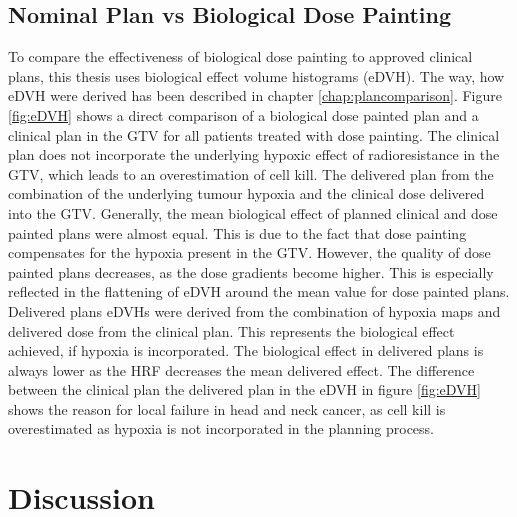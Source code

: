 \subsection{Nominal Plan vs Biological Dose Painting}
To compare the effectiveness of biological dose painting to approved clinical plans, this thesis uses biological effect volume histograms (eDVH). The way, how eDVH were derived has been described in chapter \ref{chap:plancomparison}. Figure \ref{fig:eDVH} shows a direct comparison of a biological dose painted plan and a clinical plan in the GTV for all patients treated with dose painting. The clinical plan does not incorporate the underlying hypoxic effect of radioresistance in the GTV, which leads to an overestimation of cell kill. The delivered plan from the combination of the underlying tumour hypoxia and the clinical dose delivered into the GTV. Generally, the mean biological effect of planned clinical and dose painted plans were almost equal. This is due to the fact that dose painting compensates for the hypoxia present in the GTV. However, the quality of dose painted plans decreases, as the dose gradients become higher. This is especially reflected in the flattening of eDVH around the mean value for dose painted plans. Delivered plans eDVHs were derived from the combination of hypoxia maps and delivered dose from the clinical plan. This represents the biological effect achieved, if hypoxia is incorporated. The biological effect in delivered plans is always lower as the HRF decreases the mean delivered effect. The difference between the clinical plan the delivered plan in the eDVH in figure \ref{fig:eDVH} shows the reason for local failure in head and neck cancer, as cell kill is overestimated as hypoxia is not incorporated in the planning process.
\begin{sidewaysfigure}[p]
\centering
{}
\caption{eDVH of GTV for all treated patients with biological dose painting. The biological effect of the delivered plan (blue) reduced through hypoxia is based on the clinical plan (green). Dose painting (red) is able to compensate for hypoxia by increasing the dose to such volumes. The dip in the eDVH for the delivered plan (blue) stems from the 2.5 mmHg hypoxia level.}
\label{fig:eDVH}
\end{sidewaysfigure}
\section{Discussion}
